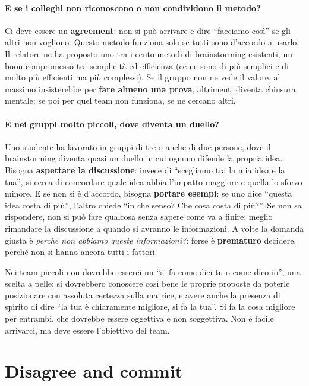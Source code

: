 \paragraph{E se i colleghi non riconoscono o non condividono il metodo?} Ci deve essere un
\textbf{agreement}: non si può arrivare e dire ``facciamo così'' se gli altri non vogliono.
Questo metodo funziona solo se tutti sono d'accordo a usarlo. Il relatore ne ha proposto
uno tra i cento metodi di brainstorming esistenti, un buon compromesso tra semplicità ed
efficienza (ce ne sono di più semplici e di molto più efficienti ma più complessi). Se il
gruppo non ne vede il valore, al massimo insisterebbe per \textbf{fare almeno una prova},
altrimenti diventa chiusura mentale; se poi per quel team non funziona, se ne cercano
altri.

\paragraph{E nei gruppi molto piccoli, dove diventa un duello?} Uno studente ha lavorato in
gruppi di tre o anche di due persone, dove il brainstorming diventa quasi un duello in cui
ognuno difende la propria idea. Bisogna \textbf{aspettare la discussione}: invece di ``scegliamo
tra la mia idea e la tua'', si cerca di concordare quale idea abbia l'impatto maggiore e
quella lo sforzo minore. E se non si è d'accordo, bisogna \textbf{portare esempi}: se uno
dice ``questa idea costa di più'', l'altro chiede ``in che senso? Che cosa costa di più?''. Se
non sa rispondere, non si può fare qualcosa senza sapere come va a finire: meglio rimandare
la discussione a quando si avranno le informazioni. A volte la domanda giusta è \emph{perché
non abbiamo queste informazioni?}: forse è \textbf{prematuro} decidere, perché non si hanno
ancora tutti i fattori.

Nei team piccoli non dovrebbe esserci un ``si fa come dici tu o come dico io'', una scelta a
pelle: si dovrebbero conoscere così bene le proprie proposte da poterle posizionare con
assoluta certezza sulla matrice, e avere anche la presenza di spirito di dire ``la tua è
chiaramente migliore, si fa la tua''. Si fa la cosa migliore per entrambi, che dovrebbe
essere oggettiva e non soggettiva. Non è facile arrivarci, ma deve essere l'obiettivo del
team.

\section{Disagree and commit}
\label{sec:z2-disagree}

